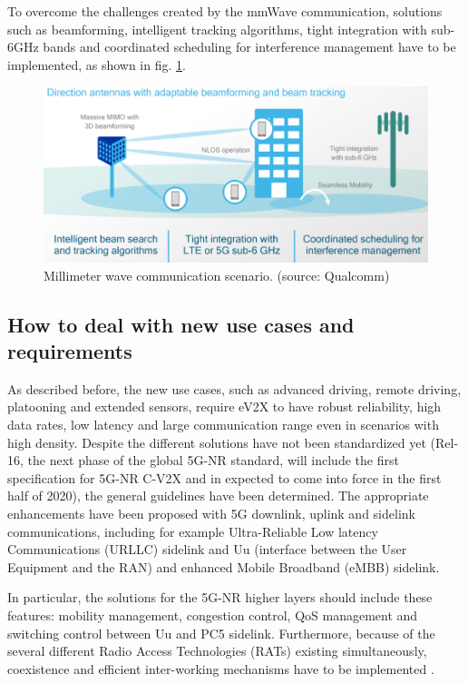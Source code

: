 \documentclass[conference,12pt,onecolumn]{IEEEtran}
\begin{document}
To overcome the challenges created by the mmWave communication, solutions such as beamforming, intelligent tracking algorithms, tight integration with sub-6GHz bands and coordinated scheduling for interference management have to be implemented, as shown in fig. \ref{fig:mmWave}.

\begin{figure}[hb]
   \centering
  \includegraphics[width=0.9\linewidth]{_Graphics/mmWave.png}
  \caption{Millimeter wave communication scenario. (source: Qualcomm)}
  \label{fig:mmWave}
\end{figure}


\subsection*{How to deal with new use cases and requirements}
As described before, the new use cases, such as advanced driving, remote driving, platooning and extended sensors, require eV2X to have robust reliability, high data rates, low latency and large communication range even in scenarios with high density. Despite the different solutions have not been standardized yet (Rel-16, the next phase of the global 5G-NR standard, will include the first specification for 5G-NR C-V2X and in expected to come into force in the first half of 2020), the general guidelines have been determined.  The appropriate enhancements have been proposed with 5G downlink, uplink and sidelink communications, including for example Ultra-Reliable Low latency Communications (URLLC) sidelink and Uu (interface between the User Equipment and the RAN) and enhanced Mobile Broadband (eMBB) sidelink.

In particular, the solutions for the 5G-NR higher layers should include these features: mobility management, congestion control, QoS management and switching control between Uu and PC5 sidelink. Furthermore, because of the several different Radio Access Technologies (RATs) existing simultaneously,  coexistence and efficient inter-working mechanisms have to be implemented \cite{chen2017vehicle}.
\end{document}
